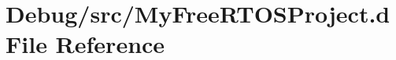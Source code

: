 \hypertarget{_my_free_r_t_o_s_project_8d}{}\section{Debug/src/\+My\+Free\+R\+T\+O\+S\+Project.d File Reference}
\label{_my_free_r_t_o_s_project_8d}
